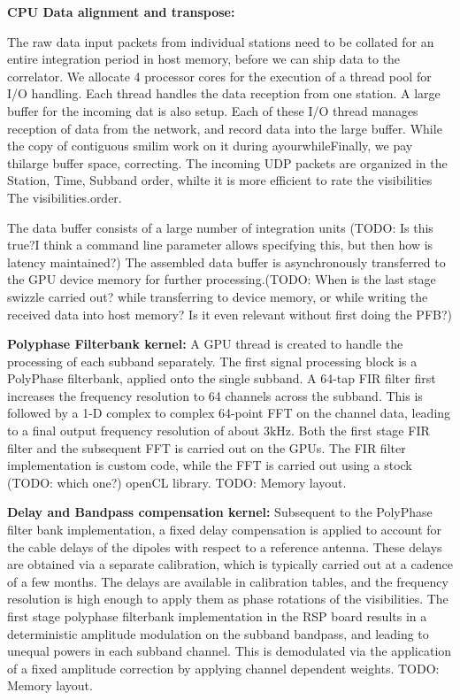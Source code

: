 \documentclass{aa}
\begin{document}
\textbf {CPU  Data alignment  and transpose:}  

The raw data input  packets from individual stations need to  be collated for an
entire  integration period  in  host memory,  before  we can  ship  data to  the
correlator. We allocate 4 processor cores for the execution of a thread pool for
I/O handling. Each  thread handles the data reception from  one station. A large
buffer for  the incoming  dat is also  setup. Each of  these I/O  thread manages
reception of data from the network, and record data into the large buffer. While
the  copy of  contiguous  smilim work  on it  during  ayourwhileFinally, we  pay
thilarge buffer space, correcting. The incoming UDP packets are organized in the
{Station,  Time,  Subband} order,  whilte  it  is  more  efficient to  rate  the
visibilities The visibilities.order.



 The data buffer consists
of a  large number of  integration units (TODO: Is  this true?I think  a command
line parameter allows specifying this, but then how is latency maintained?)  The
assembled data buffer is asynchronously transferred to the GPU device memory for
further  processing.(TODO: When  is the  last stage  swizzle carried  out? while
transferring to  device memory,  or while  writing the  received data  into host
memory? Is it even relevant without first doing the PFB?)

\textbf {Polyphase Filterbank kernel:}
A GPU thread is created to handle the processing of each subband separately. The
first signal processing block is a PolyPhase filterbank, applied onto the single
subband. A  64-tap FIR  filter first  increases the  frequency resolution  to 64
channels  across the  subband.  This  is followed  by a  1-D complex  to complex
64-point FFT on the channel data, leading to a final output frequency resolution
of about 3kHz. Both the first stage FIR filter and the subsequent FFT is carried
out on the GPUs. The FIR filter  implementation is custom code, while the FFT is
carried out using a stock (TODO: which one?) openCL library. TODO: Memory layout.

\textbf {Delay and Bandpass compensation kernel:} 
Subsequent  to  the   PolyPhase  filter  bank  implementation,   a  fixed  delay
compensation is  applied to  account for  the cable delays  of the  dipoles with
respect  to a  reference  antenna.  These  delays are  obtained  via a  separate
calibration, which is  typically carried out at  a cadence of a  few months. The
delays are available in calibration tables, and the frequency resolution is high
enough to  apply them as  phase rotations of  the visibilities. The  first stage
polyphase filterbank implementation in the  RSP board results in a deterministic
amplitude modulation on  the subband bandpass, and leading to  unequal powers in
each  subband channel.  This  is  demodulated via  the  application  of a  fixed
amplitude correction by applying channel dependent weights. TODO: Memory layout.
\end{document}

